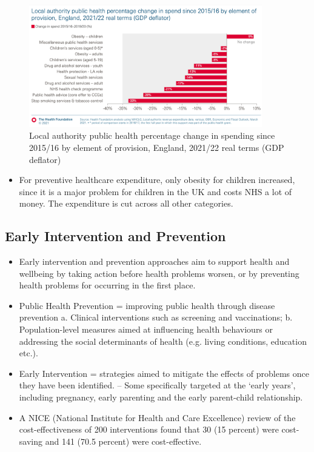         \begin{figure}[H]%
                \centering
                \includegraphics[width=4in]{images/ch3/21.png}
                \caption{Local authority public health percentage change in spending since 2015/16 by element of provision, England, 2021/22 real terms (GDP deflator)}
            \end{figure}
\begin{itemize}           
        \item For preventive healthcare expenditure, only obesity for children increased, since it is a major problem for children in the UK and costs NHS a lot of money. The expenditure is cut across all other categories.
        \end{itemize} 

        \subsection{Early Intervention and Prevention}
\begin{itemize}           
        \item Early intervention and prevention approaches aim to support health and wellbeing by taking action before health problems worsen, or by preventing health problems for occurring in the first place. 
        \item Public Health Prevention = improving public health through disease prevention
        a. Clinical interventions such as screening and vaccinations;
        b. Population-level measures aimed at influencing health behaviours or
addressing the social determinants of health (e.g. living conditions, education etc.).
        \item Early Intervention = strategies aimed to mitigate the effects of problems once they have been identified.
        – Some specifically targeted at the ‘early years’, including pregnancy, early parenting and the early parent-child relationship.
        \item A NICE (National Institute for Health and Care Excellence) review of the cost-effectiveness of 200 interventions found that 30 (15 percent) were cost-saving and 141 (70.5 percent) were cost-effective.
        \end{itemize} 

